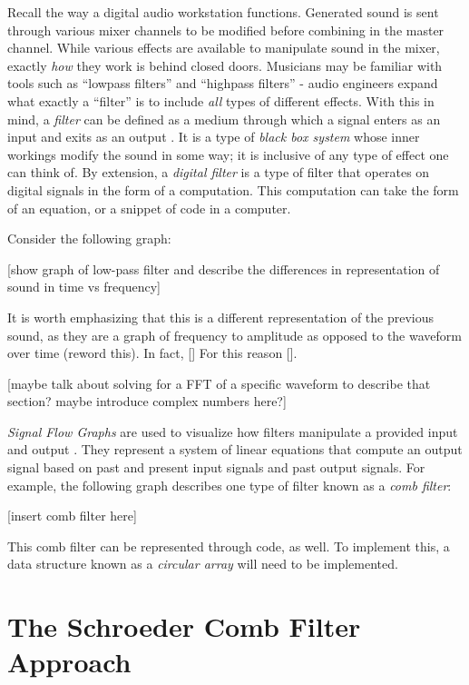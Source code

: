Recall the way a digital audio workstation functions. Generated sound is sent through various mixer channels to be modified before combining in the master channel. While various effects are available to manipulate sound in the mixer, exactly \textit{how} they work is behind closed doors. Musicians may be familiar with tools such as ``lowpass filters'' and ``highpass filters'' - audio engineers expand what exactly a ``filter'' is to include \textit{all} types of different effects. With this in mind, a \textit{filter} can be defined as a medium through which a signal enters as an input and exits as an output \cite{FILTERS07}. It is a type of \textit{black box system} whose inner workings modify the sound in some way; it is inclusive of any type of effect one can think of. By extension, a \textit{digital filter} is a type of filter that operates on digital signals in the form of a computation. This computation can take the form of an equation, or a snippet of code in a computer.

Consider the following graph:

[show graph of low-pass filter and describe the differences in representation of sound in time vs frequency]

It is worth emphasizing that this is a different representation of the previous sound, as they are a graph of frequency to amplitude as opposed to the waveform over time (reword this). In fact, [] For this reason [].

[maybe talk about solving for a FFT of a specific waveform to describe that section? maybe introduce complex numbers here?]

\textit{Signal Flow Graphs} are used to visualize how filters manipulate a provided input and output \cite{FILTERS07}. They represent a system of linear equations that compute an output signal based on past and present input signals and past output signals. For example, the following graph describes one type of filter known as a \textit{comb filter}:

[insert comb filter here]


This comb filter can be represented through code, as well. To implement this, a data structure known as a \textit{circular array} will need to be implemented.

\section{The Schroeder Comb Filter Approach}


